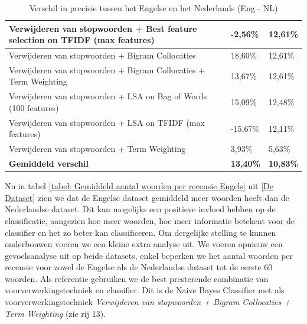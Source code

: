 \begin{table}[h]
\begin{adjustbox}{width=1\textwidth}
\begin{tabular}{|l|l|l|}
Verwijderen van stopwoorden + Best feature selection on TFIDF (max features)         & -2,56\%                                           & 12,61\%                                  \\ \hline
Verwijderen van stopwoorden + Bigram Collocaties                                     & 18,60\%                                           & 12,61\%                                  \\ \hline
Verwijderen van stopwoorden + Bigram Collocaties + Term Weighting                    & 13,67\%                                           & 12,61\%                                  \\ \hline
Verwijderen van stopwoorden + LSA on Bag of Words (100 features)                     & 15,09\%                                           & 12,48\%                                  \\ \hline
Verwijderen van stopwoorden + LSA on TFIDF (max features)                            & -15,67\%                                          & 12,11\%                                  \\ \hline
Verwijderen van stopwoorden + Term Weighting                                         & 3,93\%                                            & 5,63\%                                   \\ \hline
{\bf Gemiddeld verschil}                                                             & {\bf 13,40\%}                                     & {\bf 10,83\%}                            \\ \hline
\end{tabular}
\end{adjustbox}
\caption{Verschil in precisie tussen het Engelse en het Nederlands (Eng - NL)}
\label{tabel: verschil engels en nederlandse prestatie}
\end{table}

Nu in tabel \ref{tabel: Gemiddeld aantal woorden per recensie Engels} uit \ref{De Dataset} zien we dat de Engelse dataset gemiddeld meer woorden heeft dan de Nederlandse dataset. Dit kan mogelijks een positieve invloed hebben op de classificatie, aangezien hoe meer woorden, hoe meer informatie betekent voor de classifier en het zo beter kan classificeren. Om dergelijke stelling te kunnen onderbouwen voeren we een kleine extra analyse uit. We voeren opnieuw een gevoelsanalyse uit op beide datasets, enkel beperken we het aantal woorden per recensie voor zowel de Engelse als de Nederlandse dataset tot de eerste 60 woorden. Als referentie gebruiken we de best presterende combinatie van voorverwerkingstechniek en classifier. Dit is de Naive Bayes Classifier met als voorverwerkingstechniek \textit{Verwijderen van stopwoorden + Bigram Collocaties + Term Weighting} (zie rij 13).

